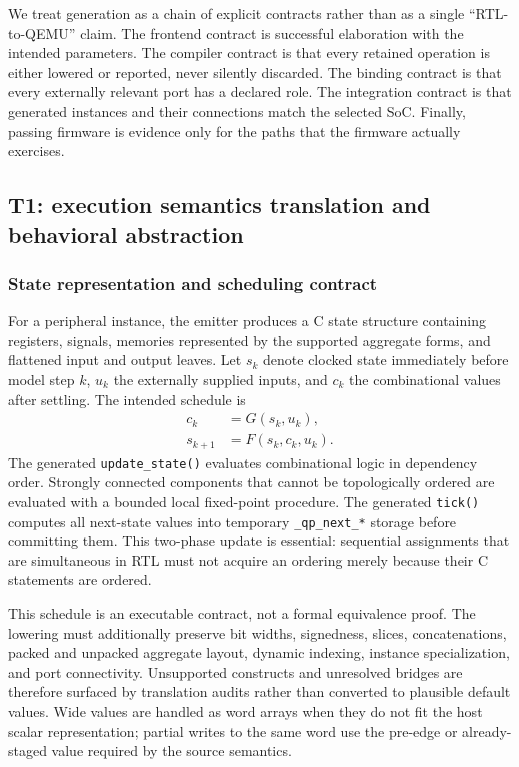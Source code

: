 We treat generation as a chain of explicit contracts rather than as a single
``RTL-to-QEMU'' claim.  The frontend contract is successful elaboration with the
intended parameters.  The compiler contract is that every retained operation is
either lowered or reported, never silently discarded.  The binding contract is
that every externally relevant port has a declared role.  The integration
contract is that generated instances and their connections match the selected
SoC.  Finally, passing firmware is evidence only for the paths that the firmware
actually exercises.

\subsection{T1: execution semantics translation and behavioral abstraction}

\subsubsection{State representation and scheduling contract}

For a peripheral instance, the emitter produces a C state structure containing
registers, signals, memories represented by the supported aggregate forms, and
flattened input and output leaves.  Let $s_k$ denote clocked state immediately
before model step $k$, $u_k$ the externally supplied inputs, and $c_k$ the
combinational values after settling.  The intended schedule is
\begin{align}
  c_k &= G(s_k,u_k), \\
  s_{k+1} &= F(s_k,c_k,u_k).
\end{align}
The generated \texttt{update\_state()} evaluates combinational logic in
dependency order.  Strongly connected components that cannot be topologically
ordered are evaluated with a bounded local fixed-point procedure.  The generated
\texttt{tick()} computes all next-state values into temporary
\texttt{\_qp\_next\_*} storage before committing them.  This two-phase update is
essential: sequential assignments that are simultaneous in RTL must not acquire
an ordering merely because their C statements are ordered.

This schedule is an executable contract, not a formal equivalence proof.  The
lowering must additionally preserve bit widths, signedness, slices,
concatenations, packed and unpacked aggregate layout, dynamic indexing, instance
specialization, and port connectivity.  Unsupported constructs and unresolved
bridges are therefore surfaced by translation audits rather than converted to
plausible default values.  Wide values are handled as word arrays when they do
not fit the host scalar representation; partial writes to the same word use the
pre-edge or already-staged value required by the source semantics.

